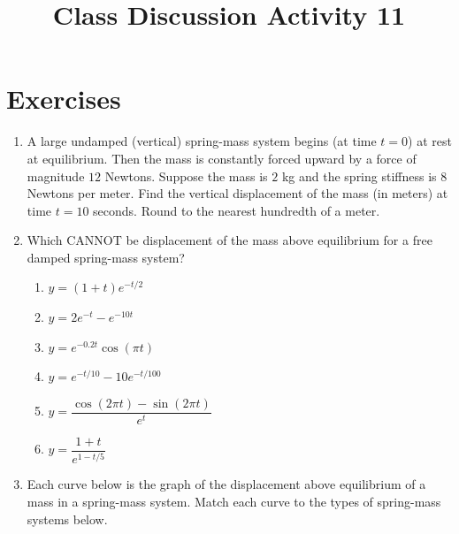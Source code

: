 \documentclass{ximera}
\begin{document}
\begin{abstract}
 \end{abstract}

    \title{Class Discussion Activity 11}
    
    \maketitle

\section*{Exercises}



\begin{enumerate}[label=(\arabic*)]


\item A large undamped (vertical) spring-mass system begins (at time $t=0$) at rest at equilibrium.  Then the mass is constantly forced upward by a force of magnitude $12$ Newtons.  Suppose the mass is $2$ kg and the spring stiffness is $8$ Newtons per meter.  Find the vertical displacement of the mass (in meters) at time $t=10$ seconds.  Round to the nearest hundredth of a meter.



\item Which CANNOT be displacement of the mass above equilibrium for a free damped spring-mass system?

\begin{enumerate}[label=(\alph*)]

\item $y=(1+t)e^{-t/2}$ 
\item $y=2e^{-t}-e^{-10t}$
\item $y=e^{-0.2t}\cos{(\pi t)}$
\item $y=e^{-t/10}-10e^{-t/100}$ 
\item $y=\dfrac{\cos{(2\pi t)}-\sin{(2\pi t)}}{e^{t}}$ 
\item $y=\dfrac{1+t}{e^{1-t/5}}$

\end{enumerate}


\newpage


\item Each curve below is the graph of the displacement above equilibrium of a mass in a spring-mass system.  Match each curve to the types of spring-mass systems below.


\end{enumerate}
\end{document}

